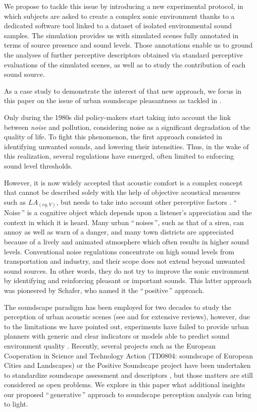 \documentclass[twoside,twocolumn]{article}
\begin{document}
We propose to tackle this issue by introducing a new experimental protocol, in which subjects are asked to create a complex sonic environment thanks to a dedicated software tool linked to a dataset of isolated environmental sound samples. The simulation provides us with simulated scenes fully annotated in terms of source presence and sound levels. Those annotations enable us to ground the analyses of further perceptive descriptors obtained via standard perceptive evaluations of the simulated scenes, as well as to study the contribution of each sound source.

As a case study to demonstrate the interest of that new approach, we focus in this paper on the issue of urban soundscape pleasantness as tackled in \cite{guastavino_ideal_2006}.

Only during the 1980s did policy-makers start taking into account the link between \textit{noise} and pollution, considering noise as a significant degradation of the quality of life. To fight this phenomenon, the first approach consisted in identifying unwanted sounds, and lowering their intensities. Thus, in the wake of this realization, several regulations have emerged, often limited to enforcing sound level thresholds. 

However, it is now widely accepted that acoustic comfort is a complex concept that cannot be described solely with the help of objective acoustical measures such as $LA_{(eq,V)}$, but needs to take into account other perceptive factors \cite{schulte-fortkamp_soundscape_2006, aletta2016soundscape, Yang2005211, kang_semantic_2010}. ``\,Noise\,''  is a cognitive object which depends upon a listener's appreciation and the context in which it is heard. Many urban ``\,noises\,'', such as that of a siren, can annoy as well as warn of a danger, and many town districts are appreciated because of a lively and animated atmosphere which often results in higher sound levels. Conventional noise regulations concentrate on high sound levels from transportation and industry, and their scope does not extend beyond unwanted sound sources. In other words, they do not try to improve the sonic environment by identifying and reinforcing pleasant or important sounds. This latter approach was pioneered by Schafer, who named it the ``\,positive\,'' approach. 

The soundscape paradigm has been employed for two decades to study the perception of urban acoustic scenes (see \cite{dubois2006cognitive} and  \cite{aletta2016soundscape} for extensive reviews), however, due to the limitations we have pointed out, experiments have failed to provide  urban planners with generic and clear indicators or models able to predict sound environment quality \cite{schulte-fortkamp_soundscape:_2007, aletta2016soundscape}. Recently, several projects such as the European Cooperation in Science and Technology Action (TD0804: soundscape of European Cities and Landscapes) or the Positive Soundscape project \cite{davies_perception_2013} have been undertaken to standardize soundscape assessment and descriptors \cite{schulte2013soundscape}, but those matters are still considered as open problems. We explore in this paper what additional insights our proposed ``\,generative\,'' approach to soundscape perception analysis can bring to light.
\end{document}

